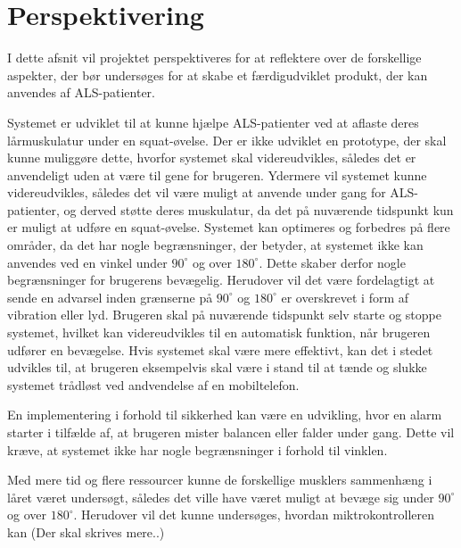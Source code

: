\section{Perspektivering}
I dette afsnit vil projektet perspektiveres for at reflektere over de forskellige aspekter, der bør undersøges for at skabe et færdigudviklet produkt, der kan anvendes af ALS-patienter. 

Systemet er udviklet til at kunne hjælpe ALS-patienter ved at aflaste deres lårmuskulatur under en squat-øvelse. Der er ikke udviklet en prototype, der skal kunne muliggøre dette, hvorfor systemet skal videreudvikles, således det er anvendeligt uden at være til gene for brugeren. Ydermere vil systemet kunne videreudvikles, således det vil være muligt at anvende under gang for ALS-patienter, og derved støtte deres muskulatur, da det på nuværende tidspunkt kun er muligt at udføre en squat-øvelse. Systemet kan optimeres og forbedres på flere områder, da det har nogle begrænsninger, der betyder, at systemet ikke kan anvendes ved en vinkel under $90^{\circ}$ og over $180^{\circ}$. Dette skaber derfor nogle begrænsninger for brugerens bevægelig. Herudover vil det være fordelagtigt at sende en advarsel inden grænserne på $90^{\circ}$ og $180^{\circ}$ er overskrevet i form af vibration eller lyd. Brugeren skal på nuværende tidspunkt selv starte og stoppe systemet, hvilket kan videreudvikles til en automatisk funktion, når brugeren udfører en bevægelse. Hvis systemet skal være mere effektivt, kan det i stedet udvikles til, at brugeren eksempelvis skal være i stand til at tænde og slukke systemet trådløst ved andvendelse af en mobiltelefon. 

En implementering i forhold til sikkerhed kan være en udvikling, hvor en alarm starter i tilfælde af, at brugeren mister balancen eller falder under gang. Dette vil kræve, at systemet ikke har nogle begrænsninger i forhold til vinklen. 

Med mere tid og flere ressourcer kunne de forskellige musklers sammenhæng i låret været undersøgt, således det ville have været muligt at bevæge sig under $90^{\circ}$ og over $180^{\circ}$. Herudover vil det kunne undersøges, hvordan miktrokontrolleren kan  (Der skal skrives mere..) 




